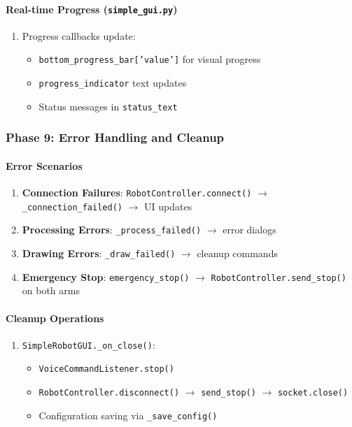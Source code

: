 \documentclass[a4paper,12pt]{article}
\begin{document}
\paragraph{Real-time Progress (\texttt{simple\_gui.py})}
\begin{enumerate}
\item Progress callbacks update:
	\begin{itemize}
	\item \texttt{bottom\_progress\_bar['value']} for visual progress
	\item \texttt{progress\_indicator} text updates
	\item Status messages in \texttt{status\_text}
	\end{itemize}
\end{enumerate}

\subsubsection{Phase 9: Error Handling and Cleanup}

\paragraph{Error Scenarios}
\begin{enumerate}
\item \textbf{Connection Failures}: \texttt{RobotController.connect()} $\rightarrow$ \texttt{\_connection\_failed()} $\rightarrow$ UI updates
\item \textbf{Processing Errors}: \texttt{\_process\_failed()} $\rightarrow$ error dialogs
\item \textbf{Drawing Errors}: \texttt{\_draw\_failed()} $\rightarrow$ cleanup commands
\item \textbf{Emergency Stop}: \texttt{emergency\_stop()} $\rightarrow$ \texttt{RobotController.send\_stop()} on both arms
\end{enumerate}

\paragraph{Cleanup Operations}
\begin{enumerate}
\item \texttt{SimpleRobotGUI.\_on\_close()}:
\begin{itemize}
\item \texttt{VoiceCommandListener.stop()}
\item \texttt{RobotController.disconnect()} $\rightarrow$ \texttt{send\_stop()} $\rightarrow$ \texttt{socket.close()}
\item Configuration saving via \texttt{\_save\_config()}
\end{itemize}
\end{enumerate}
\end{document}
